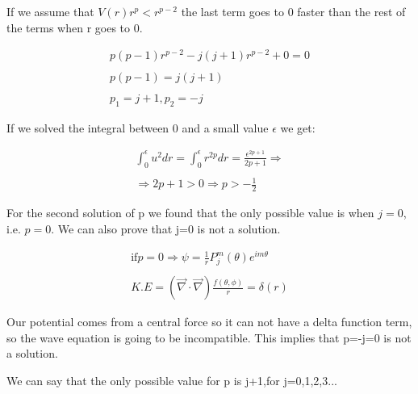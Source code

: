 If we assume that $V(r)r^p < r^{p-2}$ the last term goes to 0 faster than the rest of the terms when r goes to 0. 



\begin{equation}
  \begin{array}{c}
    p(p-1)r^{p-2} - j(j+1)r^{p-2} + 0 = 0
    \\

    \\
    p(p-1) = j(j+1)
    \\

    \\
    p_1 = j+1, p_2 = -j
  \end{array}
\end{equation}

If we solved the integral between 0 and a small value $\epsilon$ we get:

\begin{equation}
  \begin{array}{c}
    \int_{0}^{\epsilon} u^2 dr = \int_{0}^{\epsilon} r^{2p} dr = \frac{\epsilon^{2p+1}}{2p+1} \Rightarrow
    \\

    \\ \Rightarrow 2p+1 > 0 \Rightarrow p > -\frac{1}{2}
  \end{array}
\end{equation}

For the second solution of p we found that the only possible value is when $j=0$, i.e. $p=0$. We can also prove that j=0 is not a solution.

\begin{equation}
  \begin{array}{c}
    \text{if} p=0 \Rightarrow \psi = \frac{1}{r}P_j^m(\theta)e^{im\theta}
    \\

    \\
    K.E = \left(\vec{\nabla}\cdot\vec{\nabla}\right) \frac{f(\theta,\phi)}{r} = \delta(r)
  \end{array}
\end{equation}

Our potential comes from a central force so it can not have a delta function term, so the wave equation is going to be incompatible. This implies that p=-j=0 is not a solution.

We can say that the only possible value for p is j+1,for j=0,1,2,3...

